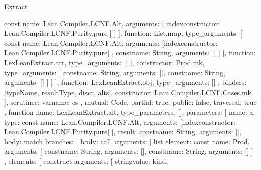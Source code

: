 \begin{lexlean}{Extract}
\begin{toolingmodule}
{{{{{{{{{{                                    const{
                                      name: Lean.Compiler.LCNF.Alt,
                                      arguments: [
                                        index{constructor: Lean.Compiler.LCNF.Purity.pure}
                                      ]
                                    }
                                  ]
                                }
                              ],
                              function: List.map,
                              type_arguments: [
                                const{
                                  name: Lean.Compiler.LCNF.Alt,
                                  arguments: [index{constructor: Lean.Compiler.LCNF.Purity.pure}]
                                },
                                const{name: String, arguments: []}
                              ]
                            }
                          ],
                          function: LexLeanExtract.arr,
                          type_arguments: []
                        }
                      ],
                      constructor: Prod.mk,
                      type_arguments: [
                        const{name: String, arguments: []},
                        const{name: String, arguments: []}
                      ]
                    }
                  ]
                }
              ],
              function: LexLeanExtract.obj,
              type_arguments: []
            },
            binders: [typeName, resultType, discr, alts],
            constructor: Lean.Compiler.LCNF.Cases.mk
          }
        ],
        scrutinee: var{name: cs}
      },
      mutual: Code,
      partial: true,
      public: false,
      traversal: true
    },
    function{
      name: LexLeanExtract.alt,
      type_parameters: [],
      parameters: [
        {
          name: a,
          type: const{
            name: Lean.Compiler.LCNF.Alt,
            arguments: [index{constructor: Lean.Compiler.LCNF.Purity.pure}]
          }
        }
      ],
      result: const{name: String, arguments: []},
      body: match{
        branches: [
          {
            body: call{
              arguments: [
                list{
                  element: const{
                    name: Prod,
                    arguments: [
                      const{name: String, arguments: []},
                      const{name: String, arguments: []}
                    ]
                  },
                  elements: [
                    construct{
                      arguments: [
                        string{value: kind},
}}}}}}}
\end{toolingmodule}
\end{lexlean}
